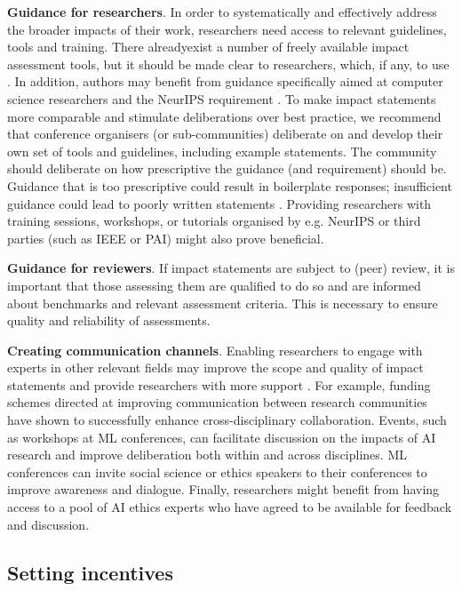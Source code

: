 \documentclass[11pt,english]{article}
\begin{document}
\textbf{Guidance for researchers}. In order to systematically and effectively address the broader impacts of their work, researchers need access to relevant guidelines, tools and training. There alreadyexist a number of freely available impact assessment tools, but it should be made clear to researchers, which, if any, to use \citep{responsible_research_and_innovation_toolkit_nodate}. 
In addition, authors may benefit from guidance specifically aimed at computer science researchers and the NeurIPS requirement \citep{ai_ethics_lab_homepage_2020,ashurst_guide_2020,hecht_suggestions_2020}. To make impact statements more comparable and stimulate deliberations over best practice, we recommend that conference organisers (or sub-communities) deliberate on and develop their own set of tools and guidelines, including example statements. The community should deliberate on how prescriptive the guidance (and requirement) should be. Guidance that is too prescriptive could result in boilerplate responses; insufficient guidance could lead to poorly written statements \citep{owen_responsible_2010}. Providing researchers with training sessions, workshops, or tutorials organised by e.g. NeurIPS or third parties (such as IEEE or PAI) might also prove beneficial. 

\textbf{Guidance for reviewers}. If impact statements are subject to (peer) review, it is important that those assessing them are qualified to do so and are informed about benchmarks and relevant assessment criteria. This is necessary to ensure quality and reliability of assessments. 

\textbf{Creating communication channels}. Enabling researchers to engage with experts in other relevant fields may improve the scope and quality of impact statements and provide researchers with more support \citep{owen_responsible_2010}. For example, funding schemes directed at improving communication between research communities have shown to successfully enhance cross-disciplinary collaboration\citep{porter_research_2012}. Events, such as workshops at ML conferences, can facilitate discussion on the impacts of AI research and improve deliberation both within and across disciplines. ML conferences can invite social science or ethics speakers to their conferences to improve awareness and dialogue. Finally, researchers might benefit from having access to a pool of AI ethics experts who have agreed to be available for feedback and discussion.

\subsection{Setting incentives}
\end{document}
